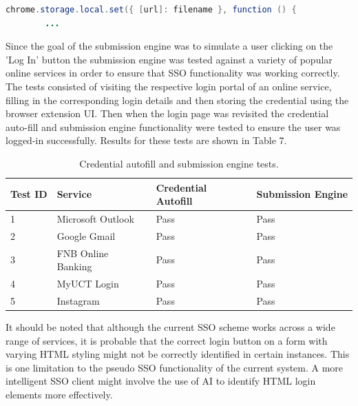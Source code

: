 \begin{lstlisting}[language=Java]
chrome.storage.local.set({ [url]: filename }, function () {
        ...
\end{lstlisting}

Since the goal of the submission engine was to simulate a user clicking on the 'Log In' button the submission engine was tested against a variety of popular online services in order to ensure that SSO functionality was working correctly. The tests consisted of visiting the respective login portal of an online service, filling in the corresponding login details and then storing the credential using the browser extension UI. Then when the login page was revisited the credential auto-fill and submission engine functionality were tested to ensure the user was logged-in successfully. Results for these tests are shown in Table 7.

\begin{table}[H]
\centering
\begin{tabular}{|l|l|l|l|}
\hline
Test ID & Service            & Credential Autofill & Submission Engine \\ \hline
1       & Microsoft Outlook  & Pass                & Pass              \\ \hline
2       & Google Gmail       & Pass                & Pass              \\ \hline
3       & FNB Online Banking & Pass                & Pass              \\ \hline
4       & MyUCT Login        & Pass                & Pass              \\ \hline
5       & Instagram          & Pass                & Pass              \\ \hline
\end{tabular}
\caption{Credential autofill and submission engine tests.}
\end{table}


It should be noted that although the current SSO scheme works across a wide range of services, it is probable that the correct login button on a form with varying HTML styling might not be correctly identified in certain instances. This is one limitation to the pseudo SSO functionality of the current system. A more intelligent SSO client might involve the use of AI to identify HTML login elements more effectively.
